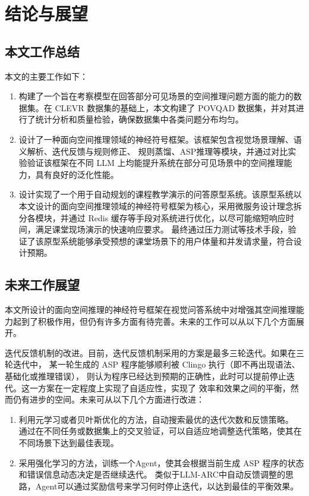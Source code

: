 \chapter{结论与展望}
\section{本文工作总结}
本文的主要工作如下：
\begin{enumerate}[itemsep=0pt,parsep=0pt]
\item 构建了一个旨在考察模型在回答部分可见场景的空间推理问题方面的能力的数据集。在 CLEVR 数据集的基础上，本文构建了 POVQAD 数据集，并对其进行了统计分析和质量检验，确保数据集中各类问题分布均匀。
\item 设计了一种面向空间推理领域的神经符号框架。该框架包含视觉场景理解、语义解析、迭代反馈与规则修正、
规则蒸馏、ASP推理等模块，并通过对比实验验证该框架在不同 LLM 上均能提升系统在部分可见场景中的空间推理能力，具有良好的泛化性能。
\item 设计实现了一个用于自动规划的课程教学演示的问答原型系统。该原型系统以本文设计的面向空间推理领域的神经符号框架为核心，采用微服务设计理念拆分各模块，并通过 Redis 缓存等手段对系统进行优化，以尽可能缩短响应时间，满足课堂现场演示的快速响应要求。
最终通过压力测试等技术手段，验证了该原型系统能够承受预想的课堂场景下的用户体量和并发请求量，符合设计预期。
\end{enumerate}
\section{未来工作展望}
本文所设计的面向空间推理的神经符号框架在视觉问答系统中对增强其空间推理能力起到了积极作用，但仍有许多方面有待完善。未来的工作可以从以下几个方面展开。

迭代反馈机制的改进。目前，迭代反馈机制采用的方案是最多三轮迭代。如果在三轮迭代中，
某一轮生成的 ASP 程序能够顺利被 Clingo 执行（即不再出现语法、基础化或推理错误），
则认为程序已经达到预期的正确性，此时可以提前停止迭代。这一方案在一定程度上实现了自适应性，实现了
效率和效果之间的平衡，然而仍有进步的空间。未来可从以下几个方面进行改进：
\begin{enumerate}[itemsep=0pt,parsep=0pt]
    \item 利用元学习或者贝叶斯优化的方法，自动搜索最优的迭代次数和反馈策略。
通过在不同任务或数据集上的交叉验证，可以自适应地调整迭代策略，使其在不同场景下达到最佳表现。
    \item 采用强化学习的方法，训练一个Agent，使其会根据当前生成 ASP 程序的状态和错误信息动态决定是否继续迭代。
类似于LLM-ARC中自动反馈调整的思路，Agent可以通过奖励信号来学习何时停止迭代，以达到最佳的平衡效果\cite{kalyanpur2024llmarcenhancingllmsautomated}。
\end{enumerate}

